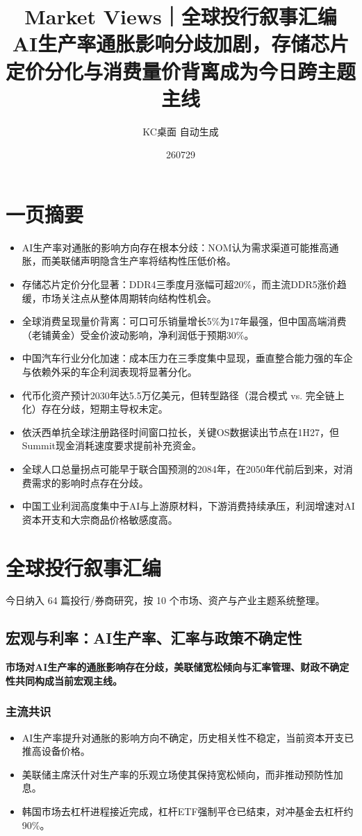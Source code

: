 \documentclass[11pt]{ctexart}
\title{\textbf{Market Views｜全球投行叙事汇编}\\[0.4em]{\large AI生产率通胀影响分歧加剧，存储芯片定价分化与消费量价背离成为今日跨主题主线}}
\author{KC桌面 自动生成}
\date{260729}
\begin{document}
\maketitle
\tableofcontents
\newpage
\section{一页摘要}
\begin{itemize}
  \item AI生产率对通胀的影响方向存在根本分歧：NOM认为需求渠道可能推高通胀，而美联储声明隐含生产率将结构性压低价格。
  \item 存储芯片定价分化显著：DDR4三季度月涨幅可超20\%，而主流DDR5涨价趋缓，市场关注点从整体周期转向结构性机会。
  \item 全球消费呈现量价背离：可口可乐销量增长5\%为17年最强，但中国高端消费（老铺黄金）受金价波动影响，净利润低于预期30\%。
  \item 中国汽车行业分化加速：成本压力在三季度集中显现，垂直整合能力强的车企与依赖外采的车企利润表现将显著分化。
  \item 代币化资产预计2030年达5.5万亿美元，但转型路径（混合模式 vs. 完全链上化）存在分歧，短期主导权未定。
  \item 依沃西单抗全球注册路径时间窗口拉长，关键OS数据读出节点在1H27，但Summit现金消耗速度要求提前补充资金。
  \item 全球人口总量拐点可能早于联合国预测的2084年，在2050年代前后到来，对消费需求的影响时点存在分歧。
  \item 中国工业利润高度集中于AI与上游原材料，下游消费持续承压，利润增速对AI资本开支和大宗商品价格敏感度高。
\end{itemize}
\section{全球投行叙事汇编}
今日纳入 64 篇投行/券商研究，按 10 个市场、资产与产业主题系统整理。
\newpage
\subsection{宏观与利率：AI生产率、汇率与政策不确定性}
\textbf{市场对AI生产率的通胀影响存在分歧，美联储宽松倾向与汇率管理、财政不确定性共同构成当前宏观主线。}
\subsubsection*{主流共识}
\begin{itemize}
  \item AI生产率提升对通胀的影响方向不确定，历史相关性不稳定，当前资本开支已推高设备价格。
  \item 美联储主席沃什对生产率的乐观立场使其保持宽松倾向，而非推动预防性加息。
  \item 韩国市场去杠杆进程接近完成，杠杆ETF强制平仓已结束，对冲基金去杠杆约90\%。
\end{itemize}
\end{document}
